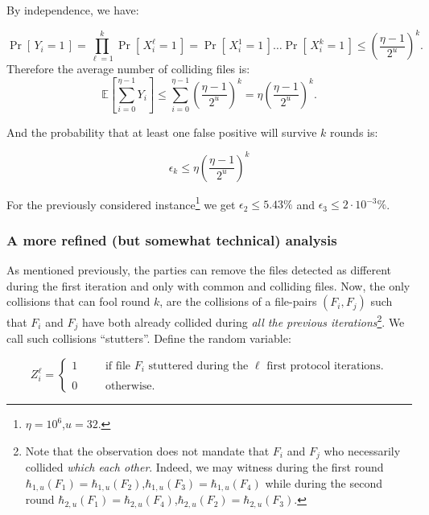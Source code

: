 \documentclass[11pt]{llncs}
\newcommand{\Prob}[1]{{\Pr\left[\,{#1}\,\right]}}
\newcommand{\EE}[1]{{\mathbb{E}\left[{#1}\right]}}
\begin{document}
By independence, we have:

 \[ \Prob{Y_i = 1} = \prod_{\ell=1}^k \Prob{X^{\ell}_i = 1} = \Prob{X^1_i = 1} \dots \Prob{X^k_i = 1} \le \left( \frac{\eta -1}{2^u} \right)^k. \]
Therefore the average number of colliding files is:
\[
 \EE{\sum_{i=0}^{\eta-1} Y_i} \le \sum_{i=0}^{\eta-1} \left( \frac{\eta -1}{2^u} \right)^k =  \eta \left(\frac{\eta - 1}{2^u}\right)^k.
\]

And the probability that at least one false positive will survive $k$ rounds is:

\[
\epsilon_k \le \eta \left(\frac{\eta - 1}{2^u}\right)^k
\]

For the previously considered instance\footnote{$\eta=10^6$,$u=32$.} we get $\epsilon_2 \le 5.43\%$ and $\epsilon_3 \le 2 \cdot 10^{-3}\%$.

\subsubsection{A more refined (but somewhat technical) analysis}

As mentioned previously, the parties can remove the files detected as different during the first iteration and only with common and colliding files. Now, the only collisions that can fool round $k$, are the collisions of a file-pairs $(F_i,F_j)$ such that $F_i$ and $F_j$ have both already collided during {\sl all the previous iterations}\footnote{Note that the observation does not mandate that $F_i$ and $F_j$ who necessarily collided {\sl which each other}. Indeed, we may witness during the first round $\hbar_{1,u}(F_1)=\hbar_{1,u}(F_2)$,$\hbar_{1,u}(F_3)=\hbar_{1,u}(F_4)$ while during the second round $\hbar_{2,u}(F_1)=\hbar_{2,u}(F_4)$,$\hbar_{2,u}(F_2)=\hbar_{2,u}(F_3)$.}. We call such collisions ``stutters''. Define the random variable:

$$
Z^\ell_i = 
\left\{
\begin{array}{lcl}
1 & ~~~~&  \mbox{if file $F_i$ stuttered during the $\ell$ first protocol iterations.}\\
\\
0 & ~~~~&  \mbox{otherwise.}
\end{array}
\right.
$$
\end{document}
